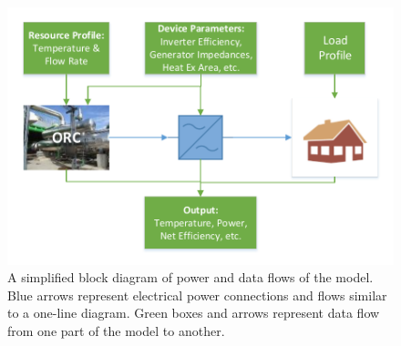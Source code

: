 \begin{figure}[h]
	\centering

	\includegraphics{figures/Abridged Pilgrim Model Flow diagram - AC bus.pdf} 

	\caption{A simplified block diagram of power and data flows of the model. Blue arrows represent electrical power connections and flows similar to a one-line diagram. Green boxes and arrows represent data flow from one part of the model to another.}
	\label{fig:abridged_flow_diagram_label}

\end{figure}